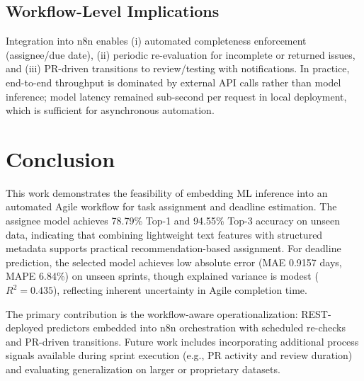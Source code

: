 \documentclass[conference]{IEEEtran}
\begin{document}
\subsection{Workflow-Level Implications}

Integration into n8n enables (i) automated completeness enforcement (assignee/due date), (ii) periodic re-evaluation for incomplete or returned issues, and (iii) PR-driven transitions to review/testing with notifications. In practice, end-to-end throughput is dominated by external API calls rather than model inference; model latency remained sub-second per request in local deployment, which is sufficient for asynchronous automation.

\section{Conclusion}

This work demonstrates the feasibility of embedding ML inference into an automated Agile workflow for task assignment and deadline estimation. The assignee model achieves 78.79\% Top-1 and 94.55\% Top-3 accuracy on unseen data, indicating that combining lightweight text features with structured metadata supports practical recommendation-based assignment. For deadline prediction, the selected model achieves low absolute error (MAE 0.9157 days, MAPE 6.84\%) on unseen sprints, though explained variance is modest ($R^2=0.435$), reflecting inherent uncertainty in Agile completion time.

The primary contribution is the workflow-aware operationalization: REST-deployed predictors embedded into n8n orchestration with scheduled re-checks and PR-driven transitions. Future work includes incorporating additional process signals available during sprint execution (e.g., PR activity and review duration) and evaluating generalization on larger or proprietary datasets.

\end{document}
